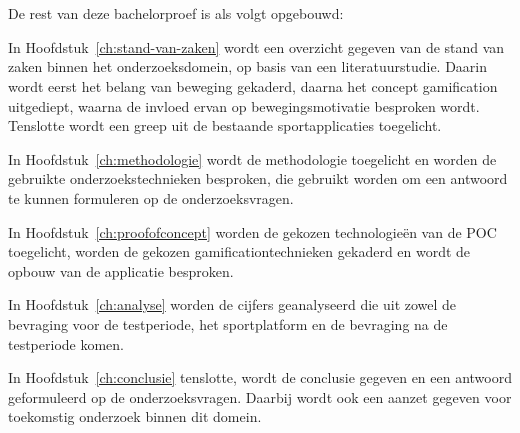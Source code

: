 
\section{}%
\label{sec:opzet-bachelorproef}

De rest van deze bachelorproef is als volgt opgebouwd:

In Hoofdstuk~\ref{ch:stand-van-zaken} wordt een overzicht gegeven van de stand van zaken binnen het onderzoeksdomein, op basis van een literatuurstudie. Daarin wordt eerst het belang van beweging gekaderd, daarna het concept gamification uitgediept, waarna de invloed ervan op bewegingsmotivatie besproken wordt. Tenslotte wordt een greep uit de bestaande sportapplicaties toegelicht.

In Hoofdstuk~\ref{ch:methodologie} wordt de methodologie toegelicht en worden de gebruikte onderzoekstechnieken besproken, die gebruikt worden om een antwoord te kunnen formuleren op de onderzoeksvragen.

In Hoofdstuk~\ref{ch:proofofconcept} worden de gekozen technologieën van de POC toegelicht, worden de gekozen gamificationtechnieken gekaderd en wordt de opbouw van de applicatie besproken.

In Hoofdstuk~\ref{ch:analyse} worden de cijfers geanalyseerd die uit zowel de bevraging voor de testperiode, het sportplatform en de bevraging na de testperiode komen.

In Hoofdstuk~\ref{ch:conclusie} tenslotte, wordt de conclusie gegeven en een antwoord geformuleerd op de onderzoeksvragen. Daarbij wordt ook een aanzet gegeven voor toekomstig onderzoek binnen dit domein.